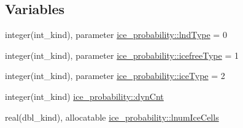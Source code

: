\subsection*{Variables}
\begin{DoxyCompactItemize}
\item 
integer(int\_\-kind), parameter \hyperlink{namespaceice__probability_aaabce4689cd62ee3719275cd92df9912}{ice\_\-probability::lndType} = 0
\item 
integer(int\_\-kind), parameter \hyperlink{namespaceice__probability_ac98da6fa34da83bf3df15cd5c9e6e2e5}{ice\_\-probability::icefreeType} = 1
\item 
integer(int\_\-kind), parameter \hyperlink{namespaceice__probability_afcfe5a08d7e0f132380df3a8716e38df}{ice\_\-probability::iceType} = 2
\item 
integer(int\_\-kind) \hyperlink{namespaceice__probability_a4ee8ce398fcfff914562169106ab0f2e}{ice\_\-probability::dynCnt}
\item 
real(dbl\_\-kind), allocatable \hyperlink{namespaceice__probability_a15428ca096f845ed45a6caddd622c7c8}{ice\_\-probability::lnumIceCells}
\end{DoxyCompactItemize}
